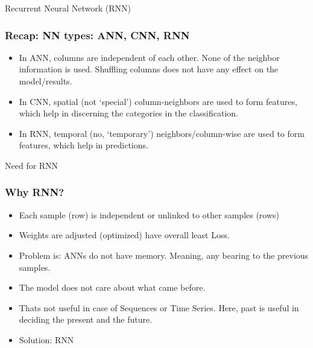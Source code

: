 \begin{frame}
  \begin{center}
    {\Large Recurrent Neural Network (RNN)}
  \end{center}
\end{frame}


\begin{frame}[fragile] \frametitle{Recap: NN types: ANN, CNN, RNN}

\begin{itemize}
\item In ANN, columns are independent of each other. None of the neighbor information is used. Shuffling columns does not have any effect on the model/results.
\item In CNN, spatial (not `special') column-neighbors are used to form features, which help in discerning the categories in the classification.
\item In RNN, temporal (no, `temporary') neighbors/column-wise are used to form features, which help in predictions.
\end{itemize}

\end{frame}



\begin{frame}
  \begin{center}
    {\Large Need for RNN}
  \end{center}
\end{frame}


\begin{frame}[fragile] \frametitle{Why RNN?}

\begin{itemize}
\item Each sample (row) is independent or unlinked to other samples (rows)
\item Weights are adjusted (optimized) have overall least Loss.
\item Problem is: ANNs do not have memory. Meaning, any bearing to the previous samples.
\item The model does not care about what came before.
\item Thats not useful in case of Sequences or Time Series. Here, past is useful in deciding the present and the future.
\item Solution: RNN
\end{itemize}


\end{frame}

